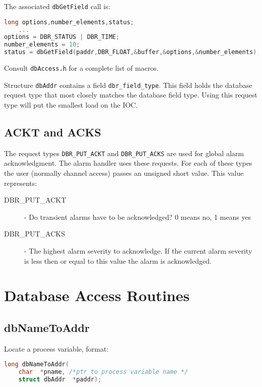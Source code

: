 The associated \verb|dbGetField| call is:

\begin{lstlisting}[language=C]
long options,number_elements,status;
    ...
options = DBR_STATUS | DBR_TIME;
number_elements = 10;
status = dbGetField(paddr,DBR_FLOAT,&buffer,&options,&number_elements);
\end{lstlisting}

Consult \verb|dbAccess.h| for a complete list of macros.

Structure \verb|dbAddr| contains a field \verb|dbr_field_type|.
This field holds the database request type that most closely matches the database field type.
Using this request type will put the smallest load on the IOC.

\subsection{ACKT and ACKS}

The request types \verb|DBR_PUT_ACKT| and \verb|DBR_PUT_ACKS| are used for global alarm acknowledgment.
The alarm handler uses these requests.
For each of these types the user (normally channel access) passes an unsigned short value.
This value represents:

\begin{description}

\item[DBR\_PUT\_ACKT]  - Do transient alarms have to be acknowledged? 0 means no, 1 means yes

\item[DBR\_PUT\_ACKS] - The highest alarm severity to acknowledge.
If the current alarm severity is less then or equal to this value the alarm is acknowledged.

\end{description}

\section{Database Access Routines}

\subsection{dbNameToAddr}

Locate a process variable, format:

\begin{lstlisting}[language=C]
long dbNameToAddr(
    char  *pname, /*ptr to process variable name */
    struct dbAddr  *paddr);
\end{lstlisting}

